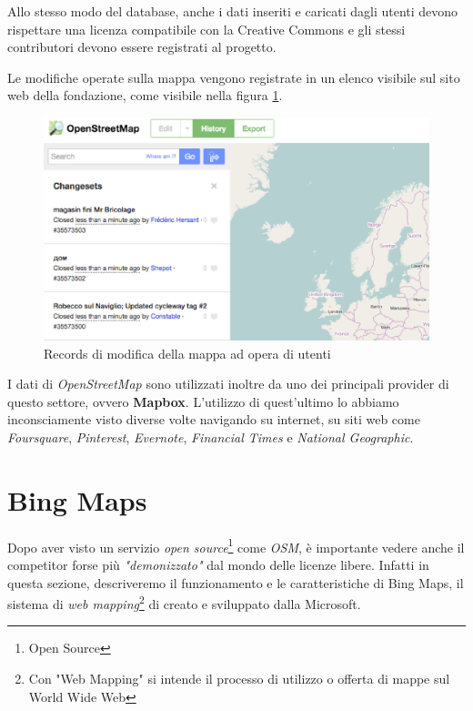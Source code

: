 Allo stesso modo del database, anche i dati inseriti e caricati dagli utenti devono rispettare una licenza compatibile con la Creative Commons e gli stessi contributori devono essere registrati al progetto.

Le modifiche operate sulla mappa vengono registrate in un elenco visibile sul sito web della fondazione, come visibile nella figura \ref{fig:OSMchangesets}.

\begin{figure}[H]
	\centering
		\includegraphics[scale=0.5]{figure/OSMchangesets.eps}
	\caption{Records di modifica della mappa ad opera di utenti} \label{fig:OSMchangesets}
\end{figure}


I dati di \textit{OpenStreetMap} sono utilizzati inoltre da uno dei principali provider di questo settore, ovvero \textbf{Mapbox}. L'utilizzo di quest'ultimo lo abbiamo inconsciamente visto diverse volte navigando su internet, su siti web come \textit{Foursquare}, \textit{Pinterest}, \textit{Evernote}, \textit{Financial Times} e \textit{National Geographic}.\cite{mapbox:showcase}

\section{Bing Maps}

Dopo aver visto un servizio \textit{open source}\footnote{Open Source\cite{wiki:opensource}} come \textit{OSM}, è importante vedere anche il competitor forse più \textit{"demonizzato"} dal mondo delle licenze libere. Infatti in questa sezione, descriveremo il funzionamento e le caratteristiche di Bing Maps, il sistema di \textit{web mapping}\footnote{Con "Web Mapping" si intende il processo di utilizzo o offerta di mappe sul World Wide Web} di creato e sviluppato dalla Microsoft.

